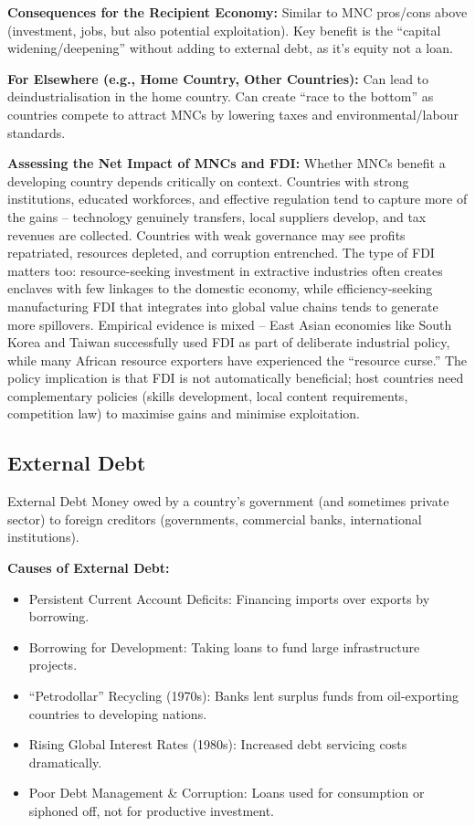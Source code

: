 \documentclass[11pt, a4paper, twoside]{book}
\begin{document}
\textbf{Consequences for the Recipient Economy:} Similar to MNC pros/cons above (investment, jobs, but also potential exploitation). Key benefit is the ``capital widening/deepening'' without adding to external debt, as it's equity not a loan.

\textbf{For Elsewhere (e.g., Home Country, Other Countries):} Can lead to deindustrialisation in the home country. Can create ``race to the bottom'' as countries compete to attract MNCs by lowering taxes and environmental/labour standards.

\textbf{Assessing the Net Impact of MNCs and FDI:} Whether MNCs benefit a developing country depends critically on context. Countries with strong institutions, educated workforces, and effective regulation tend to capture more of the gains -- technology genuinely transfers, local suppliers develop, and tax revenues are collected. Countries with weak governance may see profits repatriated, resources depleted, and corruption entrenched. The type of FDI matters too: resource-seeking investment in extractive industries often creates enclaves with few linkages to the domestic economy, while efficiency-seeking manufacturing FDI that integrates into global value chains tends to generate more spillovers. Empirical evidence is mixed -- East Asian economies like South Korea and Taiwan successfully used FDI as part of deliberate industrial policy, while many African resource exporters have experienced the ``resource curse.'' The policy implication is that FDI is not automatically beneficial; host countries need complementary policies (skills development, local content requirements, competition law) to maximise gains and minimise exploitation.

\subsection{External Debt}

\begin{keyterm}{External Debt}
Money owed by a country's government (and sometimes private sector) to foreign creditors (governments, commercial banks, international institutions).
\end{keyterm}

\textbf{Causes of External Debt:}
\begin{itemize}
  \item Persistent Current Account Deficits: Financing imports over exports by borrowing.
  \item Borrowing for Development: Taking loans to fund large infrastructure projects.
  \item ``Petrodollar'' Recycling (1970s): Banks lent surplus funds from oil-exporting countries to developing nations.
  \item Rising Global Interest Rates (1980s): Increased debt servicing costs dramatically.
  \item Poor Debt Management \& Corruption: Loans used for consumption or siphoned off, not for productive investment.
\end{itemize}
\end{document}

